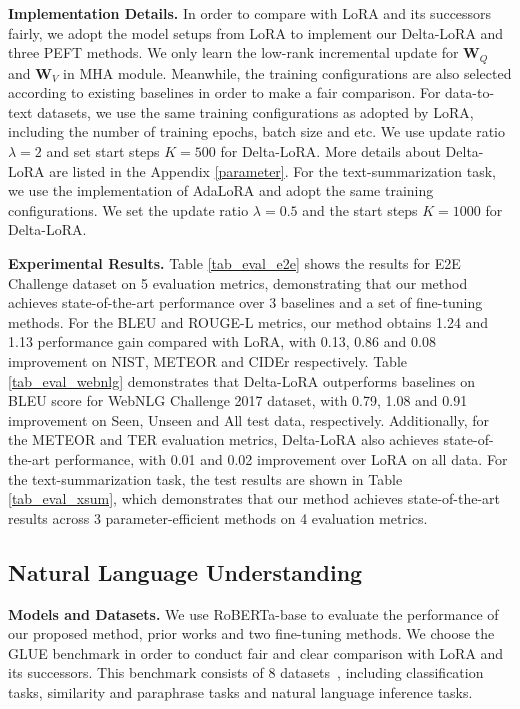 {\textbf{Implementation Details.} In order to compare with LoRA and its successors fairly, we adopt the model setups from LoRA to implement our Delta-LoRA and three PEFT methods. We only learn the low-rank incremental update for $\boldsymbol{W}_Q$ and $\boldsymbol{W}_V$ in MHA module. Meanwhile, the training configurations are also selected according to existing baselines in order to make a fair comparison. For data-to-text datasets, we use the same training configurations as adopted by LoRA, including the number of training epochs, batch size and etc. We use update ratio $\lambda=2$ and set start steps $K=500$ for Delta-LoRA. More details about Delta-LoRA are listed in the Appendix \ref{parameter}.
For the text-summarization task, we use the implementation of AdaLoRA and adopt the same training configurations. We set the update ratio $\lambda=0.5$ and the start steps $K=1000$ for Delta-LoRA.

\textbf{Experimental Results.} Table \ref{tab_eval_e2e} shows the results for E2E Challenge dataset on 5 evaluation metrics, demonstrating that our method achieves state-of-the-art performance over 3 baselines and a set of fine-tuning methods. For the BLEU and ROUGE-L metrics, our method obtains 1.24 and 1.13 performance gain compared with LoRA, with 0.13, 0.86 and 0.08 improvement on NIST, METEOR and CIDEr respectively. Table \ref{tab_eval_webnlg} demonstrates that Delta-LoRA outperforms baselines on BLEU score for WebNLG Challenge 2017 dataset, with 0.79, 1.08 and 0.91 improvement on Seen, Unseen and All test data, respectively. Additionally, for the METEOR and TER evaluation metrics, Delta-LoRA also achieves state-of-the-art performance, with 0.01 and 0.02 improvement over LoRA on all data. For the text-summarization task, the test results are shown in Table \ref{tab_eval_xsum}, which demonstrates that our method achieves state-of-the-art results across 3 parameter-efficient methods on 4 evaluation metrics. 

\subsection{Natural Language Understanding}
\textbf{Models and Datasets.} We use RoBERTa-base to evaluate the performance of our proposed method, prior works and two fine-tuning methods. We choose the GLUE benchmark in order to conduct fair and clear comparison with LoRA and its successors. This benchmark consists of 8 datasets~\citep{wang2018glue}, including classification tasks, similarity and paraphrase tasks and natural language inference tasks.

}
